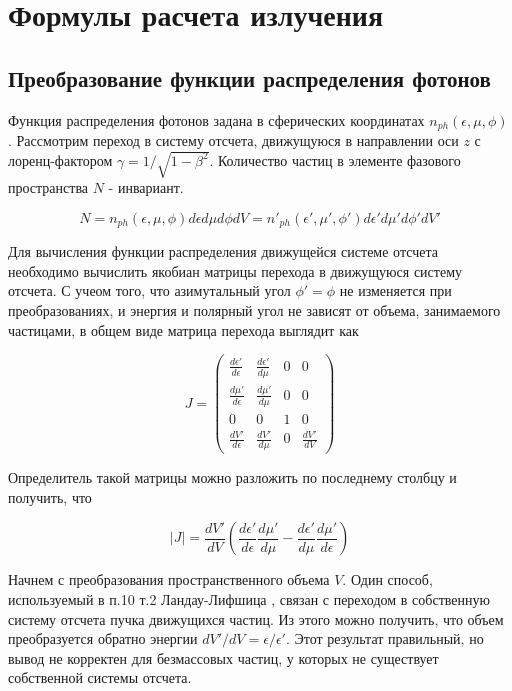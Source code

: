 \chapter{Формулы расчета излучения}\label{Formulae}

\section{Преобразование функции распределения фотонов}
Функция распределения фотонов задана в сферических координатах $n_{ph}(\epsilon,\mu,\phi)$. Рассмотрим переход в систему отсчета, движущуюся в направлении оси $z$ с лоренц-фактором $\gamma = 1/\sqrt{1-\beta^2}$. Количество частиц в элементе фазового пространства $N$ - инвариант.

\begin{equation}
	N = n_{ph}(\epsilon,\mu,\phi)d\epsilon d\mu d\phi dV = n'_{ph}(\epsilon',\mu',\phi')d\epsilon' d\mu' d\phi' dV'
\end{equation}

Для вычисления функции распределения движущейся системе отсчета необходимо вычислить якобиан матрицы перехода в движущуюся систему отсчета. С учеом того, что азимутальный угол $\phi' = \phi$ не изменяется при преобразованиях, и энергия и полярный угол не зависят от объема, занимаемого частицами, в общем виде матрица перехода выглядит как

\begin{equation}\label{generalJacobi}
J=\left(
\begin{array}{cccc}
\frac{d\epsilon'}{d\epsilon} & \frac{d\epsilon'}{d\mu}& 0 & 0\\
\frac{d\mu'}{d\epsilon} & \frac{d\mu'}{d\mu} & 0 & 0\\
0 & 0 & 1 & 0\\
\frac{dV'}{d\epsilon} & \frac{dV'}{d\mu} & 0 & \frac{dV'}{dV}
\end{array}
\right)
\end{equation}

Определитель такой матрицы можно разложить по последнему столбцу и получить, что

\begin{equation}
|J|=\frac{dV'}{dV}\left(\frac{d\epsilon'}{d\epsilon}\frac{d\mu'}{d\mu} - \frac{d\epsilon'}{d\mu}\frac{d\mu'}{d\epsilon}\right)
\end{equation}

Начнем с преобразования пространственного объема $V$. Один способ, используемый в п.10 т.2 Ландау-Лифшица \cite{LandauLifshitz2}, связан с переходом в собственную систему отсчета пучка движущихся частиц. Из этого можно получить, что объем преобразуется обратно энергии $dV'/dV= \epsilon/\epsilon'$. Этот результат правильный, но вывод не корректен для безмассовых частиц, у которых не существует собственной системы отсчета.

